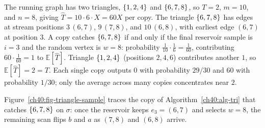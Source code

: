\begin{labbox}
The running graph has two triangles, $\{1,2,4\}$ and $\{6,7,8\}$, so $T=2$,
$m=10$, and $n=8$, giving $\widehat T=10\cdot 6\cdot X=60X$ per copy. The
triangle $\{6,7,8\}$ has edges at stream positions $3\,(6,7)$, $9\,(7,8)$, and
$10\,(6,8)$, with earliest edge $(6,7)$ at position $3$. A copy catches
$\{6,7,8\}$ if and only if the final reservoir sample is $i=3$ and the random
vertex is $w=8$: probability $\frac{1}{10}\cdot\frac{1}{6}=\frac{1}{60}$,
contributing $60\cdot\frac{1}{60}=1$ to $\mathbb{E}[\widehat T]$. Triangle
$\{1,2,4\}$ (positions $2,4,6$) contributes another $1$, so
$\mathbb{E}[\widehat T]=2=T$. Each single copy outputs $0$ with probability
$29/30$ and $60$ with probability $1/30$; only the average across many copies
concentrates near $2$.
\end{labbox}

Figure~\ref{ch40:fig-triangle-sample} traces the copy of Algorithm~\ref{ch40:alg-tri} that catches $\{6,7,8\}$ on $\sigma$: once the reservoir keeps $e_3=(6,7)$ and selects $w=8$, the remaining scan flips $b$ and $a$ as $(7,8)$ and $(6,8)$ arrive.

